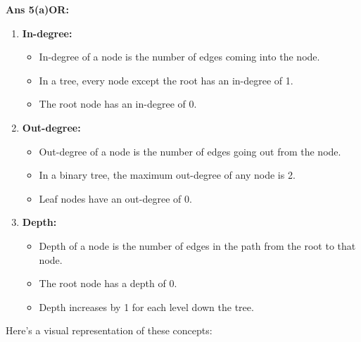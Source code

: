 \textbf{Ans 5(a)OR:}

\begin{enumerate}
\def\labelenumi{\arabic{enumi}.}
\tightlist
\item
  \textbf{In-degree:}

  \begin{itemize}
  \tightlist
  \item
    In-degree of a node is the number of edges coming into the node.
  \item
    In a tree, every node except the root has an in-degree of 1.
  \item
    The root node has an in-degree of 0.
  \end{itemize}
\item
  \textbf{Out-degree:}

  \begin{itemize}
  \tightlist
  \item
    Out-degree of a node is the number of edges going out from the node.
  \item
    In a binary tree, the maximum out-degree of any node is 2.
  \item
    Leaf nodes have an out-degree of 0.
  \end{itemize}
\item
  \textbf{Depth:}

  \begin{itemize}
  \tightlist
  \item
    Depth of a node is the number of edges in the path from the root to
    that node.
  \item
    The root node has a depth of 0.
  \item
    Depth increases by 1 for each level down the tree.
  \end{itemize}
\end{enumerate}

Here's a visual representation of these concepts:

\begin{Shaded}
\begin{Highlighting}[]

\end{Highlighting}
\end{Shaded}

